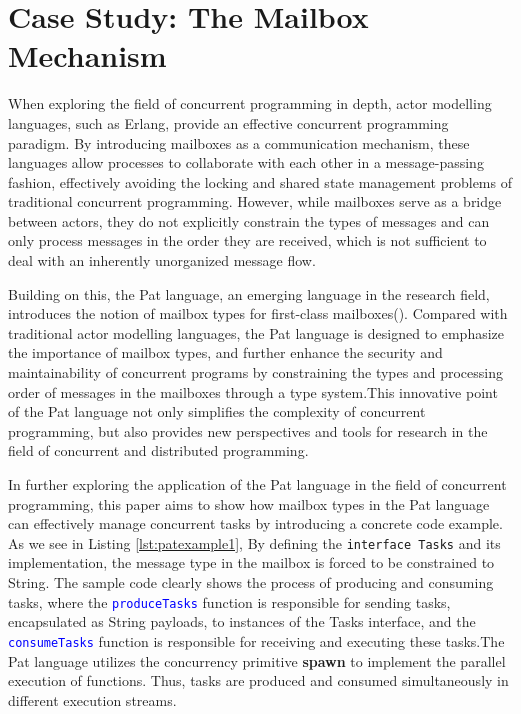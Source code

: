 \documentclass{l4proj}
\begin{document}
\section{Case Study: The Mailbox Mechanism}

When exploring the field of concurrent programming in depth, actor modelling languages, such as Erlang, provide an effective concurrent programming paradigm. By introducing mailboxes as a communication mechanism, these languages allow processes to collaborate with each other in a message-passing fashion, effectively avoiding the locking and shared state management problems of traditional concurrent programming. However, while mailboxes serve as a bridge between actors, they do not explicitly constrain the types of messages and can only process messages in the order they are received, which is not sufficient to deal with an inherently unorganized message flow.

Building on this, the Pat language, an emerging language in the research field, introduces the notion of mailbox types for first-class mailboxes(\cite{fowler_2023_special}). Compared with traditional actor modelling languages, the Pat language is designed to emphasize the importance of mailbox types, and further enhance the security and maintainability of concurrent programs by constraining the types and processing order of messages in the mailboxes through a type system.This innovative point of the Pat language not only simplifies the complexity of concurrent programming, but also provides new perspectives and tools for research in the field of concurrent and distributed programming.

In further exploring the application of the Pat language in the field of concurrent programming, this paper aims to show how mailbox types in the Pat language can effectively manage concurrent tasks by introducing a concrete code example. As we see in Listing \ref{lst:patexample1}, By defining the \texttt{interface Tasks} and its implementation, the message type in the mailbox is forced to be constrained to String. The sample code clearly shows the process of producing and consuming tasks, where the \textcolor{blue}{\texttt{produceTasks}} function is responsible for sending tasks, encapsulated as String payloads, to instances of the Tasks interface, and the \textcolor{blue}{\texttt{consumeTasks}} function is responsible for receiving and executing these tasks.The Pat language utilizes the concurrency primitive \textbf{spawn} to implement the parallel execution of functions. Thus, tasks are produced and consumed simultaneously in different execution streams. 
\end{document}

